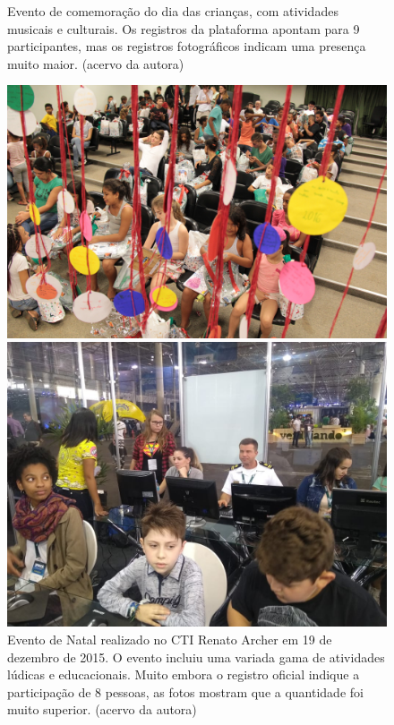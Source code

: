 \documentclass[
12pt,		%
openright,	%
twoside,  %
a4paper,			%
chapter=TITLE,		%
english,			%
french,				%
spanish,			%
brazil				%
]{USPSC-classe/USPSC}
\begin{document}
\begin{figure}[max size={\textwidth}{\textheight}]
\begin{minipage}[b]{0.4\linewidth}
                \caption{Evento de comemora\c{c}\~ao do dia das crian\c{c}as, com atividades musicais e culturais. Os registros da plataforma apontam para 9 participantes, mas os registros fotogr\'aficos indicam uma presen\c{c}a muito maior. (acervo da autora)}
                \label{31e991b69f3aba382518bb571a4e69a720fa8ccb}
\end{minipage}
\hspace{0.5cm}
\begin{minipage}[b]{0.4\linewidth}
        \centering
                \includegraphics[width=1.0\linewidth]{../../imagens/confraternizacao-de-natal-menor.jpeg}
                \caption{Evento de Natal realizado no CTI Renato Archer em 19 de dezembro de 2015. O evento incluiu uma variada gama de atividades l\'udicas e educacionais. Muito embora o registro oficial indique a participa\c{c}\~ao de 8 pessoas, as fotos mostram que a quantidade foi muito superior. (acervo da autora)}
                \label{afa1b2acd7f4c590f25d9821e48e82568bd28cf2}
\end{minipage}%
\hspace{0.5cm}
\begin{minipage}[b]{0.4\linewidth}
        \centering
                \includegraphics[width=1.0\linewidth]{../../imagens/Evento-Greenk-2018-05-27.jpg}

\end{minipage}
\end{figure}
\end{document}
